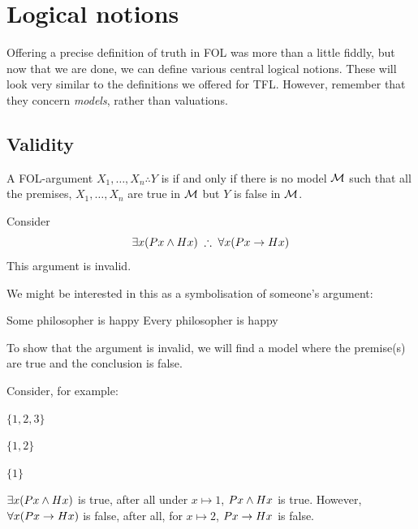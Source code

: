 \chapter{Logical notions}


Offering a precise definition of truth in FOL was more than a little fiddly, but now that we are done, we can define various central logical notions. These will look very similar to the definitions we offered for TFL. However, remember that they concern \emph{models}, rather than valuations.
\section{Validity}
\begin{definition}A FOL-argument $X_1,\ldots,X_n\therefore Y$ is  if and only if there is no model ${\mathcal{M}}$ such that all the premises, $X_1,\ldots,X_n$ are true in ${\mathcal{M}}$ but $Y$ is false in ${\mathcal{M}}$.\end{definition}


Consider \[\exists x(Px\eand Hx)\; \therefore\; \forall x(Px\eif Hx)\]
This argument is invalid. 

We might be interested in this as a symbolisation of someone's argument: 
\begin{earg}
	\prem Some philosopher is happy
	\conc Every philosopher is happy
\end{earg}

To show that the argument is invalid, we will find a model where the premise(s) are true and the conclusion is false. 

Consider, for example: 
\begin{interp}
	\item[\domain] $\{1,2,3\}$
	\item[\denote{P}] $\{1,2\}$
	\item[\denote{H}] $\{1\}$
\end{interp}

$\exists x(Px\mathbin{\wedge} Hx)$ is true, after all under $x\mapsto 1$, $Px\mathbin{\wedge} Hx$ is true. However, $\forall x(Px\rightarrow Hx)$ is false, after all, for $x\mapsto 2$, $Px\rightarrow Hx$ is false. 

